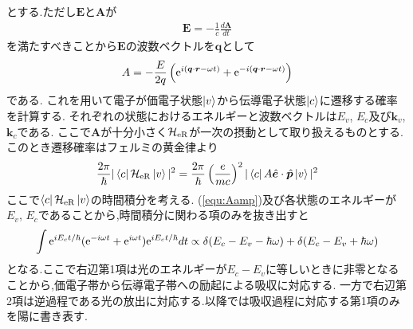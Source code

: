 \documentclass[uplatex,a4j,11pt,dvipdfmx]{jsarticle}
\begin{document}
とする.ただし${\bm E}$と${\bm A}$が
\begin{align}
  {\bm E}=-\frac{1}{c}\frac{d{\bm A}}{dt}
\end{align}
を満たすべきことから$\bm E$の波数ベクトルを$\bm q$として
\begin{align}
  \label{equ:Aamp}
  A=-\frac{E}{2q}\left({\rm e}^{i({\bm q}\cdot{\bm r}-\omega t)}+{\rm e}^{-i({\bm q}\cdot{\bm r}-\omega t)}\right)
\end{align}
である.
これを用いて電子が価電子状態$\ket{v}$から伝導電子状態$\ket{c}$に遷移する確率を計算する.
それぞれの状態におけるエネルギーと波数ベクトルは$E_v$, $E_c$及び${\bm k}_v$, ${\bm k}_c$である.
ここで$\bm A$が十分小さく$\mathcal{H}_{\rm eR}$が一次の摂動として取り扱えるものとする.
このとき遷移確率はフェルミの黄金律より
\begin{align}
  \label{equ:fermi_golden}
  \frac{2\pi}{\hbar}|\bra{c}\mathcal{H}_{\rm eR}\ket{v}|^2=\frac{2\pi}{\hbar}\left(\frac{e}{mc}\right)^2|\bra{c}A\hat{\bm e}\cdot\hat{\bm p}\ket{v}|^2
\end{align}
ここで$\bra{c}\mathcal{H}_{\rm eR}\ket{v}$の時間積分を考える.
(\ref{equ:Aamp})及び各状態のエネルギーが$E_v$, $E_c$であることから,時間積分に関わる項のみを抜き出すと
\begin{align}
  \int{\rm e}^{iE_ct/\hbar}({\rm e}^{-i\omega t}+{\rm e}^{i\omega t}){\rm e}^{iE_ct/\hbar}dt
  \propto\delta(E_c-E_v-\hbar\omega)+\delta(E_c-E_v+\hbar\omega)
\end{align}
となる.ここで右辺第1項は光のエネルギーが$E_c-E_v$に等しいときに非零となることから,価電子帯から伝導電子帯への励起による吸収に対応する.
一方で右辺第2項は逆過程である光の放出に対応する.以降では吸収過程に対応する第1項のみを陽に書き表す.
\end{document}
